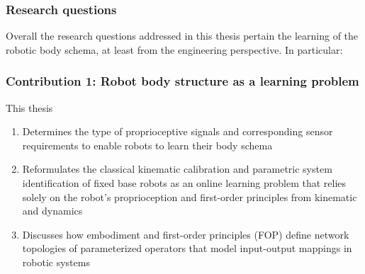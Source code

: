 \documentclass[12pt, a4paper]{article}
\begin{document}
\subsubsection*{Research questions}
Overall the research questions addressed in this thesis pertain the learning of the robotic body schema, at least from the engineering perspective. In particular:
\begin{shaded}
\end{shaded}
\begin{shaded}
\end{shaded}
\begin{shaded}
\end{shaded}

\subsubsection*{Contribution 1: Robot body structure as a learning problem}
This thesis
\begin{enumerate}
	\item Determines the type of proprioceptive signals and corresponding sensor requirements to enable robots to learn their body schema	
	\item Reformulates the classical kinematic calibration and parametric system identification of fixed base robots as an online learning problem that relies solely on the robot's proprioception and first-order principles from kinematic and dynamics 
	\item Discusses how embodiment and first-order principles (FOP) define network topologies of parameterized operators that model input-output mappings in robotic systems
\end{enumerate}
\end{document}
